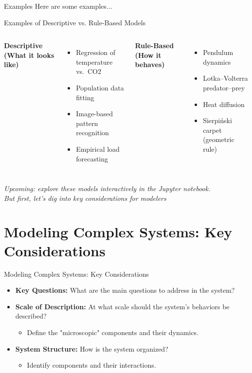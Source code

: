 \documentclass{beamer}
\begin{document}
\begin{frame}{Examples}
Here are some examples...
\end{frame}

\begin{frame}{Examples of Descriptive vs. Rule-Based Models}
\begin{columns}
\textbf{Descriptive (What it looks like)}
\begin{itemize}
  \item Regression of temperature vs.\ CO2
  \item Population data fitting
  \item Image-based pattern recognition
  \item Empirical load forecasting
\end{itemize}

\textbf{Rule-Based (How it behaves)}
\begin{itemize}
  \item Pendulum dynamics
  \item Lotka--Volterra predator--prey
  \item Heat diffusion
  \item Sierpiński carpet (geometric rule)
\end{itemize}
\end{columns}

\vspace{0.5em}
\textit{Upcoming: explore these models interactively in the Jupyter notebook.}\\
\textit{But first, let's dig into key considerations for modelers}
\end{frame}


\section{Modeling Complex Systems: Key Considerations}
\begin{frame}{Modeling Complex Systems: Key Considerations}
    \begin{itemize}
        \item \textbf{Key Questions:} What are the main questions to address in the system?
        \item \textbf{Scale of Description:} At what scale should the system's behaviors be described?
        \begin{itemize}
            \item Define the "microscopic" components and their dynamics.
        \end{itemize}
        \item \textbf{System Structure:} How is the system organized?
        \begin{itemize}
            \item Identify components and their interactions.
        \end{itemize}
    \end{itemize}
\end{frame}
\end{document}
